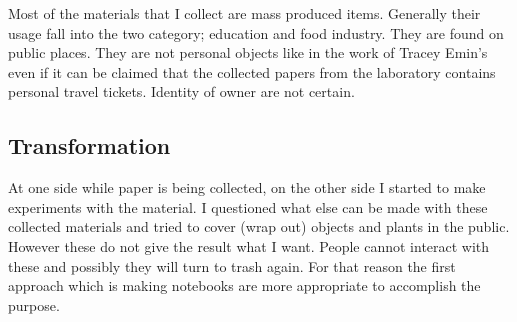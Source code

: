 Most of the materials that I collect are mass produced items. Generally their usage fall into the two category; education and food industry. They are found on public places. They are not personal objects like in the work of Tracey Emin's  even if it can be claimed that the collected papers from the laboratory contains personal travel tickets. Identity of owner are not certain.








\subsection{Transformation}
At one side while paper is being collected, on the other side I started to make experiments with the material. I questioned what else can be made with these collected materials and tried to cover (wrap out) objects and plants in the public. However these do not give the result what I want. People cannot interact with these and possibly they will turn to trash again. For that reason the first approach which is making notebooks are more appropriate to accomplish the purpose.

